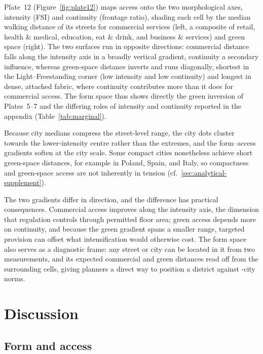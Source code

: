 \documentclass[review,authoryear]{elsarticle}
\begin{document}
Plate~12 (Figure~\ref{fig:plate12}) maps access onto the two morphological axes, intensity (FSI) and continuity (frontage ratio), shading each cell by the median walking distance of its streets for commercial services (left, a composite of retail, health \& medical, education, eat \& drink, and business \& services) and green space (right). The two surfaces run in opposite directions: commercial distance falls along the intensity axis in a broadly vertical gradient, continuity a secondary influence, whereas green-space distance inverts and runs diagonally, shortest in the Light--Freestanding corner (low intensity and low continuity) and longest in dense, attached fabric, where continuity contributes more than it does for commercial access. The form space thus shows directly the green inversion of Plates~5--7 and the differing roles of intensity and continuity reported in the appendix (Table~\ref{tab:marginal}).

Because city medians compress the street-level range, the city dots cluster towards the lower-intensity centre rather than the extremes, and the form--access gradients soften at the city scale. Some compact cities nonetheless achieve short green-space distances, for example in Poland, Spain, and Italy, so compactness and green-space access are not inherently in tension (cf.\ \ref{sec:analytical-supplement}).

The two gradients differ in direction, and the difference has practical consequences. Commercial access improves along the intensity axis, the dimension that regulation controls through permitted floor area; green access depends more on continuity, and because the green gradient spans a smaller range, targeted provision can offset what intensification would otherwise cost. The form space also serves as a diagnostic frame: any street or city can be located in it from two measurements, and its expected commercial and green distances read off from the surrounding cells, giving planners a direct way to position a district against \nCities{}-city norms.

\section{Discussion}
\label{sec:discussion}

\subsection{Form and access}
\end{document}
